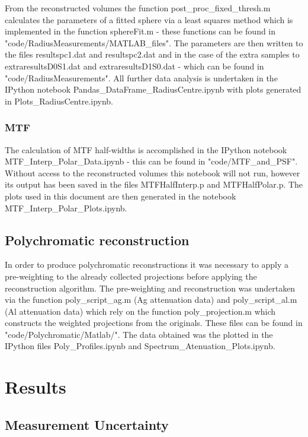\documentclass[
  twoside,
  11pt, a4paper,
  footinclude=true,
  headinclude=true,
  cleardoublepage=empty
]{scrbook}
\begin{document}
From the reconstructed volumes the function post\_proc\_fixed\_thresh.m calculates the parameters of a fitted sphere via a least squares method which is implemented in the function sphereFit.m - these functions can be found in "code/RadiusMeasurements/MATLAB\_files". The parameters are then written to the files resultspc1.dat and resultspc2.dat and in the case of the extra samples to extraresultsD0S1.dat and extraresultsD1S0.dat - which can be found in  "code/RadiusMeasurements". All further data analysis is undertaken in the IPython notebook Pandas\_DataFrame\_RadiusCentre.ipynb with plots generated in Plots\_RadiusCentre.ipynb.

\subsection{MTF}

The calculation of MTF half-widths is accomplished in the IPython notebook MTF\_Interp\_Polar\_Data.ipynb - this can be found in "code/MTF\_and\_PSF". Without access to the reconstructed volumes this notebook will not run, however its output has been saved in the files MTFHalfInterp.p and MTFHalfPolar.p. The plots used in this document are then generated in the notebook MTF\_Interp\_Polar\_Plots.ipynb.

\section{Polychromatic reconstruction}

In order to produce polychromatic reconstructions it was necessary to apply a pre-weighting to the already collected projections before applying the reconstruction algorithm. The pre-weighting and reconstruction was undertaken via the function poly\_script\_ag.m (Ag attenuation data) and poly\_script\_al.m (Al attenuation data) which rely on the function poly\_projection.m which constructs the weighted projections from the originals. These files can be found in "code/Polychromatic/Matlab/". The data obtained was the plotted in the IPython files Poly\_Profiles.ipynb and Spectrum\_Atenuation\_Plots.ipynb.


\chapter{Results}


\section{Measurement Uncertainty}
\end{document}
